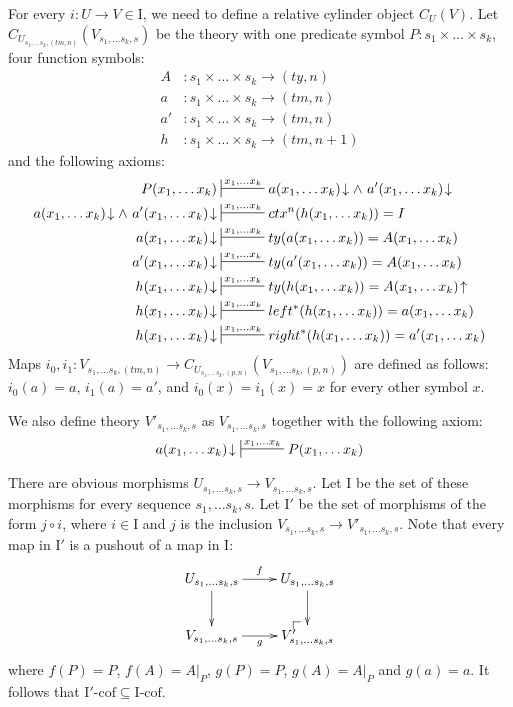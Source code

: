 \documentclass[reqno]{amsart}
\makeatletter
\theoremstyle{definition}
\theoremstyle{remark}
\newcommand{\I}{\mathrm{I}}
\newcommand{\class}[2]{#1\text{-}\mathrm{#2}}
\newcommand{\Icof}[1][\I]{\class{#1}{cof}}
\newcommand{\cyli}{i}
\numberwithin{figure}{section}
\newcommand{\po}[1][dr]{\save*!/#1+1.2pc/#1:(1,-1)@^{|-}\restore}
\makeatother
\begin{document}
For every $i : U \to V \in \I$, we need to define a relative cylinder object $C_U(V)$.
Let $C_{U_{s_1, \ldots s_k, (tm,n)}}(V_{s_1, \ldots s_k, s})$ be the theory with one predicate symbol $P : s_1 \times \ldots \times s_k$,
four function symbols:
\begin{align*}
A & : s_1 \times \ldots \times s_k \to (ty,n) \\
a & : s_1 \times \ldots \times s_k \to (tm,n) \\
a' & : s_1 \times \ldots \times s_k \to (tm,n) \\
h & : s_1 \times \ldots \times s_k \to (tm,n+1)
\end{align*}
and the following axioms:
\begin{align*}
P(x_1, \ldots x_k) & \sststile{}{x_1, \ldots x_k} a(x_1, \ldots x_k)\!\downarrow \land\ a'(x_1, \ldots x_k)\!\downarrow \\
a(x_1, \ldots x_k)\!\downarrow \land\ a'(x_1, \ldots x_k)\!\downarrow & \sststile{}{x_1, \ldots x_k} ctx^n(h(x_1, \ldots x_k)) = I \\
a(x_1, \ldots x_k)\!\downarrow & \sststile{}{x_1, \ldots x_k} ty(a(x_1, \ldots x_k)) = A(x_1, \ldots x_k) \\
a'(x_1, \ldots x_k)\!\downarrow & \sststile{}{x_1, \ldots x_k} ty(a'(x_1, \ldots x_k)) = A(x_1, \ldots x_k) \\
h(x_1, \ldots x_k)\!\downarrow & \sststile{}{x_1, \ldots x_k} ty(h(x_1, \ldots x_k)) = A(x_1, \ldots x_k)\!\uparrow \\
h(x_1, \ldots x_k)\!\downarrow & \sststile{}{x_1, \ldots x_k} left^*(h(x_1, \ldots x_k)) = a(x_1, \ldots x_k) \\
h(x_1, \ldots x_k)\!\downarrow & \sststile{}{x_1, \ldots x_k} right^*(h(x_1, \ldots x_k)) = a'(x_1, \ldots x_k)
\end{align*}
Maps $\cyli_0,\cyli_1 : V_{s_1, \ldots s_k, (tm,n)} \to C_{U_{s_1, \ldots s_k, (p,n)}}(V_{s_1, \ldots s_k, (p,n)})$ are defined as follows:
$\cyli_0(a) = a$, $\cyli_1(a) = a'$, and $\cyli_0(x) = \cyli_1(x) = x$ for every other symbol $x$.

We also define theory $V'_{s_1, \ldots s_k, s}$ as $V_{s_1, \ldots s_k, s}$ together with the following axiom:
\[ a(x_1, \ldots x_k)\!\downarrow\ \sststile{}{x_1, \ldots x_k} P(x_1, \ldots x_k) \]

There are obvious morphisms $U_{s_1, \ldots s_k, s} \to V_{s_1, \ldots s_k, s}$.
Let $\I$ be the set of these morphisms for every sequence $s_1, \ldots s_k, s$.
Let $\I'$ be the set of morphisms of the form $j \circ i$, where $i \in \I$ and $j$ is the inclusion $V_{s_1, \ldots s_k, s} \to V'_{s_1, \ldots s_k, s}$.
Note that every map in $\I'$ is a pushout of a map in $\I$:
\[ \xymatrix{ U_{s_1, \ldots s_k, s} \ar[r]^f \ar[d] & U_{s_1, \ldots s_k, s} \ar[d] \\
              V_{s_1, \ldots s_k, s} \ar[r]_g & \po V'_{s_1, \ldots s_k, s}
            } \]
where $f(P) = P$, $f(A) = A|_P$, $g(P) = P$, $g(A) = A|_P$ and $g(a) = a$.
It follows that $\Icof[\I'] \subseteq \Icof$.
\end{document}
